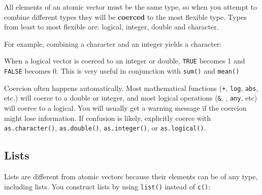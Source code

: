 All elements of an atomic vector must be the same type, so when you
attempt to combine different types they will be \textbf{coerced} to the
most flexible type. Types from least to most flexible are: logical,
integer, double and character.

For example, combining a character and an integer yields a character:

\begin{Shaded}
\begin{Highlighting}[]
\NormalTok{(}\NormalTok{(}\NormalTok{, }\NormalTok{))}
\end{Highlighting}
\end{Shaded}

When a logical vector is coerced to an integer or double, \texttt{TRUE}
becomes 1 and \texttt{FALSE} becomes 0. This is very useful in
conjunction with \texttt{sum()} and \texttt{mean()}

\begin{Shaded}
\begin{Highlighting}[]
\StringTok{ }\NormalTok{(}\NormalTok{, }\NormalTok{, }\NormalTok{)}
\end{Highlighting}
\end{Shaded}

Coercion often happens automatically. Most mathematical functions
(\texttt{+}, \texttt{log}, \texttt{abs}, etc.) will coerce to a double
or integer, and most logical operations (\texttt{\&},
\texttt{\textbar{}}, \texttt{any}, etc) will coerce to a logical. You
will usually get a warning message if the coercion might lose
information. If confusion is likely, explicitly coerce with
\texttt{as.character()}, \texttt{as.double()}, \texttt{as.integer()}, or
\texttt{as.logical()}.

\subsection{Lists}\label{lists}

Lists are different from atomic vectors because their elements can be of
any type, including lists. You construct lists by using \texttt{list()}
instead of \texttt{c()}:

